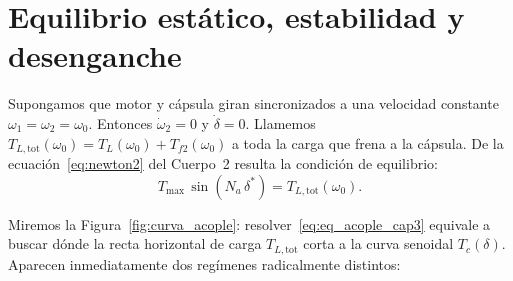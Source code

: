 \documentclass[11pt,a4paper,oneside]{book}
\begin{document}
\section{Equilibrio estático, estabilidad y desenganche}

Supongamos que motor y cápsula giran sincronizados a una velocidad constante
$\omega_1 = \omega_2 = \omega_0$. Entonces $\dot\omega_2 = 0$ y $\dot\delta = 0$.
Llamemos $T_{L,\text{tot}}(\omega_0) = T_L(\omega_0) + T_{f2}(\omega_0)$ a toda
la carga que frena a la cápsula. De la ecuación~\eqref{eq:newton2} del Cuerpo~2
resulta la condición de equilibrio:
\begin{equation}
  T_{\max}\,\sin(N_a\,\delta^\ast) = T_{L,\text{tot}}(\omega_0).
  \label{eq:eq_acople_cap3}
\end{equation}

Miremos la Figura~\ref{fig:curva_acople}: resolver~\eqref{eq:eq_acople_cap3}
equivale a buscar dónde la recta horizontal de carga $T_{L,\text{tot}}$ corta a
la curva senoidal $T_c(\delta)$. Aparecen inmediatamente dos regímenes
radicalmente distintos:
\end{document}
